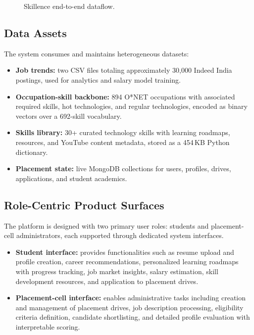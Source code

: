\documentclass[conference]{IEEEtran}
\begin{document}
\begin{figure}[htbp]
{
}%
\caption{Skillence end-to-end dataflow.}
\label{fig:architecture}
\end{figure}

\subsection{Data Assets}
The system consumes and maintains heterogeneous datasets:
\begin{itemize}
\item \textbf{Job trends:} two CSV files totaling approximately 30,000
      Indeed India postings, used for analytics and salary model training.
\item \textbf{Occupation-skill backbone:} 894 O*NET occupations with
      associated required skills, hot technologies, and regular
      technologies, encoded as binary vectors over a 692-skill vocabulary.
\item \textbf{Skills library:} 30+ curated technology skills with
      learning roadmaps, resources, and YouTube content metadata, stored
      as a 454\,KB Python dictionary.
\item \textbf{Placement state:} live MongoDB collections for users,
      profiles, drives, applications, and student academics.
\end{itemize}

\subsection{Role-Centric Product Surfaces}
The platform is designed with two primary user roles: students and placement-cell administrators, each supported through dedicated system interfaces.

\begin{itemize}
\item \textbf{Student interface:} provides functionalities such as resume upload and profile creation, career recommendations, personalized learning roadmaps with progress tracking, job market insights, salary estimation, skill development resources, and application to placement drives.

\item \textbf{Placement-cell interface:} enables administrative tasks including creation and management of placement drives, job description processing, eligibility criteria definition, candidate shortlisting, and detailed profile evaluation with interpretable scoring.
\end{itemize}
\end{document}

